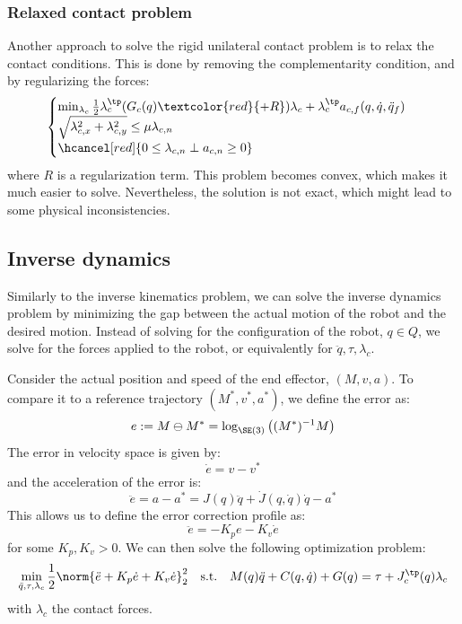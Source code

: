 \subsubsection{Relaxed contact problem}
Another approach to solve the rigid unilateral contact problem is to relax the contact conditions. This is done by removing the complementarity condition, and by regularizing the forces:
\begin{equation*}
    \begin{cases}
        \min_{\lambda_c} \frac{1}{2}\lambda_c^\tp (G_c(q)\textcolor{red}{+R})\lambda_c + \lambda_c^\tp a_{c, f}(q, \dot{q}, \ddot{q}_f) \\
        \sqrt{\lambda_{c,x}^2 + \lambda_{c,y}^2} \leq \mu\lambda_{c,n}\\
        \hcancel[red]{0\leq\lambda_{c,n} \perp a_{c,n}\geq 0}
    \end{cases}
\end{equation*}
where $R$ is a regularization term. This problem becomes convex, which makes it much easier to solve. Nevertheless, the solution is not exact, which might lead to some physical inconsistencies.

\subsection{Inverse dynamics}
Similarly to the inverse kinematics problem, we can solve the inverse dynamics problem by minimizing the gap between the actual motion of the robot and the desired motion. Instead of solving for the configuration of the robot, $q\in Q$, we solve for the forces applied to the robot, or equivalently for $\ddot{q}, \tau, \lambda_c$.

Consider the actual position and speed of the end effector, $(M, v, a)$. To compare it to a reference trajectory $(M^*, v^*, a^*)$, we define the error as:
\begin{equation}
    e := M\ominus M^* = \log_{\SE(3)}\left((M^*)^{-1}M\right)
\end{equation}
The error in velocity space is given by:
\begin{equation*}
    \dot{e} = v - v^*
\end{equation*}
and the acceleration of the error is:
\begin{equation*}
    \ddot{e} = a - a^* = J(q)\ddot{q} + \dot{J}(q, \dot{q})\dot{q} - a^*
\end{equation*}
This allows us to define the error correction profile as:
\begin{equation}
    \ddot{e}=-K_pe-K_v\dot{e}
\end{equation}
for some $K_p, K_v>0$. We can then solve the following optimization problem:
\begin{equation*}
    \min_{\ddot{q},\tau,\lambda_c} \frac{1}{2}\norm{\ddot{e}+K_p\dot{e}+K_v\dot{e}}_2^2 \quad\text{s.t.}\quad M(q)\ddot{q} + C(q, \dot{q}) + G(q) = \tau + J_c^\tp(q)\lambda_c
\end{equation*}
with $\lambda_c$ the contact forces.
